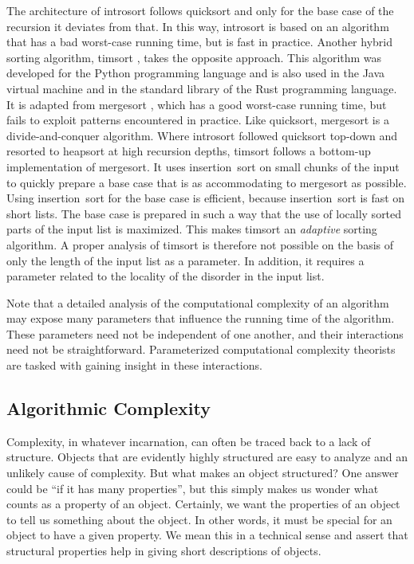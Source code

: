 \begin{example}
  The architecture of introsort follows quicksort and only for the base case of the recursion it deviates from that.
  In this way, introsort is based on an algorithm that has a bad worst-case running time, but is  fast in practice.
  Another hybrid sorting algorithm, timsort \parencite{peters:timsort}, takes the opposite approach.
  This algorithm was developed for the Python programming language and is also used in the Java virtual machine and in the standard library of the Rust programming language.
  It is adapted from mergesort \parencite{cormen2009introduction}, which has a good worst-case running time, but fails to exploit patterns encountered in practice.
  Like quicksort, mergesort is a divide-and-conquer algorithm.
  Where introsort followed quicksort top-down and resorted to heapsort at high recursion depths, timsort follows a bottom-up implementation of mergesort.
  It uses insertion~sort on small chunks of the input to quickly prepare a base case that is as accommodating to mergesort as possible.
  Using insertion~sort for the base case is efficient, because insertion~sort is fast on short lists.
  The base case is prepared in such a way that the use of locally sorted parts of the input list is maximized.
  This makes timsort an \emph{adaptive} sorting algorithm.
  A proper analysis of timsort is therefore not possible on the basis of only the length of the input list as a parameter.
  In addition, it requires a parameter related to the locality of the disorder in the input list.
\end{example}

Note that a detailed analysis of the computational complexity of an algorithm may expose many parameters that influence the running time of the algorithm.
These parameters need not be independent of one another, and their interactions need not be straightforward.
Parameterized computational complexity theorists are tasked with gaining insight in these interactions.

\subsection{Algorithmic Complexity}
Complexity, in whatever incarnation, can often be traced back to a lack of structure.
Objects that are evidently highly structured are easy to analyze and an unlikely cause of complexity.
But what makes an object structured?
One answer could be \enquote{if it has many properties}, but this simply makes us wonder what counts as a property of an object.
Certainly, we want the properties of an object to tell us something about the object.
In other words, it must be special for an object to have a given property.
We mean this in a technical sense and assert that structural properties help in giving short descriptions of objects.

